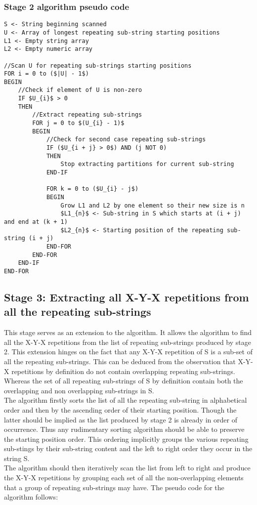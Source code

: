 \documentclass[12pt]{article}
\begin{document}
\begin{flushleft}
	\subsubsection{Stage 2 algorithm pseudo code}

\begin{lstlisting}
S <- String beginning scanned
U <- Array of longest repeating sub-string starting positions
L1 <- Empty string array
L2 <- Empty numeric array

//Scan U for repeating sub-strings starting positions 
FOR i = 0 to ($|U| - 1$)  
BEGIN			                
	//Check if element of U is non-zero
	IF $U_{i}$ > 0 
	THEN
		//Extract repeating sub-strings
		FOR j = 0 to $(U_{i} - 1)$ 
		BEGIN                  
			//Check for second case repeating sub-strings
			IF ($U_{i + j} > 0$) AND (j NOT 0) 
			THEN
				Stop extracting partitions for current sub-string
			END-IF
			
			FOR k = 0 to ($U_{i} - j$)
			BEGIN                               
				Grow L1 and L2 by one element so their new size is n
				$L1_{n}$ <- Sub-string in S which starts at (i + j) and end at (k + 1)
				$L2_{n}$ <- Starting position of the repeating sub-string (i + j)
			END-FOR
		END-FOR
	END-IF	
END-FOR		
\end{lstlisting}
	\newpage	
	\subsection{Stage 3: Extracting all X-Y-X repetitions from all the repeating sub-strings}
	This stage serves as an extension to the algorithm. It allows the algorithm to find all the X-Y-X repetitions from the list of repeating sub-strings produced by stage 2. This extension hinges on the fact that any X-Y-X repetition of S is a sub-set of all the repeating sub-strings. This can be deduced from the observation that X-Y-X repetitions by definition do not contain overlapping repeating sub-strings. Whereas the set of all repeating sub-strings of S by definition contain both the overlapping and non overlapping sub-strings in S.\\
	The algorithm firstly sorts the list of all the repeating sub-string in alphabetical order and then by the ascending order of their starting position. Though the latter should be implied as the list produced by stage 2 is already in order of occurrence. Thus any rudimentary sorting algorithm should be able to preserve the starting position order. This ordering implicitly groups the various repeating sub-stings by their sub-string content and the left to right order they occur in the string S.\\
	The algorithm should then iteratively scan the list from left to right and produce the X-Y-X repetitions by grouping each set of all the non-overlapping elements that a group of repeating sub-strings may have. The pseudo code for the algorithm follows:
	\newpage

\end{flushleft}
\end{document}
